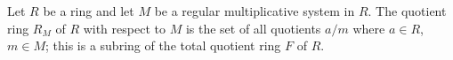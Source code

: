 Let $R$ be a ring and let $M$ be a regular multiplicative system in $R$. The quotient ring $R_M$ of $R$ with respect to $M$ is the set of all quotients $a/m$ where $a \in R$, $m \in M$; this is a subring of the total quotient ring $F$ of $R$.
